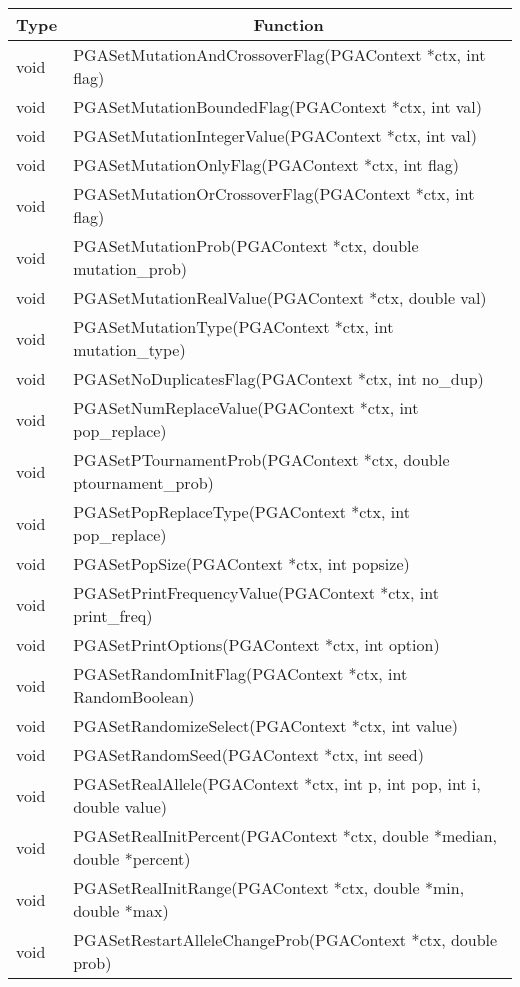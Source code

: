 \documentclass{report}
\begin{document}
\begin{tabular}{|l|l|} \hline\hline
\multicolumn{1}{|c|}{Type} &
\multicolumn{1}{c|}{Function}  \\  \hline\hline
void &  PGASetMutationAndCrossoverFlag(PGAContext *ctx, int flag) \\ \hline
void &  PGASetMutationBoundedFlag(PGAContext *ctx, int val) \\ \hline
void &  PGASetMutationIntegerValue(PGAContext *ctx, int val) \\ \hline
void &  PGASetMutationOnlyFlag(PGAContext *ctx, int flag) \\ \hline
void &  PGASetMutationOrCrossoverFlag(PGAContext *ctx, int flag) \\ \hline
void &  PGASetMutationProb(PGAContext *ctx, double mutation\_prob) \\ \hline
void &  PGASetMutationRealValue(PGAContext *ctx, double val) \\ \hline
void &  PGASetMutationType(PGAContext *ctx, int mutation\_type) \\ \hline
void &  PGASetNoDuplicatesFlag(PGAContext *ctx, int no\_dup) \\ \hline
void &  PGASetNumReplaceValue(PGAContext *ctx, int pop\_replace) \\ \hline
void &  PGASetPTournamentProb(PGAContext *ctx, double ptournament\_prob) \\ \hline
void &  PGASetPopReplaceType(PGAContext *ctx, int pop\_replace) \\ \hline
void &  PGASetPopSize(PGAContext *ctx, int popsize) \\ \hline
void &  PGASetPrintFrequencyValue(PGAContext *ctx, int print\_freq) \\ \hline
void &  PGASetPrintOptions(PGAContext *ctx, int option) \\ \hline
void &  PGASetRandomInitFlag(PGAContext *ctx, int RandomBoolean) \\ \hline
void &  PGASetRandomizeSelect(PGAContext *ctx, int value) \\ \hline
void &  PGASetRandomSeed(PGAContext *ctx, int seed) \\ \hline
void &  PGASetRealAllele(PGAContext *ctx, int p, int pop, int i, double value)
\\ \hline
void &  PGASetRealInitPercent(PGAContext *ctx, double *median, double
*percent) \\ \hline
void &  PGASetRealInitRange(PGAContext *ctx, double *min, double *max) \\ \hline
void &  PGASetRestartAlleleChangeProb(PGAContext *ctx, double prob) \\ \hline

\end{tabular}
\end{document}
